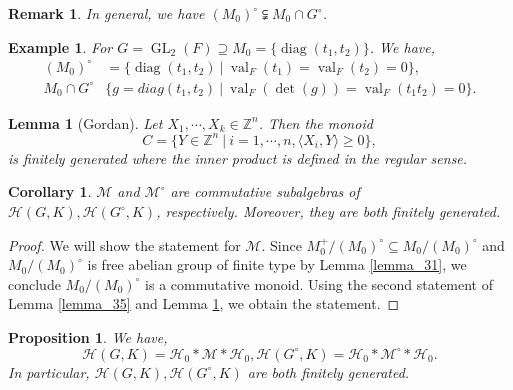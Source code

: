 \documentclass[8pt]{article}
\newtheorem{proposition}{Proposition}[section]
\newtheorem{lemma}{Lemma}[section]
\newtheorem{remark}{Remark}[section]
\newtheorem{corollary}{Corollary} [section]
\newtheorem{example}{Example}[section]
\DeclareMathOperator{\GL}{GL}
\DeclareMathOperator{\val}{val}
\DeclareMathOperator{\diag}{diag}
\newcommand{\Z}[0]{\mathbb{Z}}
\newcommand{\sep}[0]{\:|\:}
\newcommand{\hecke}[0]{\mathscr{H}}
\begin{document}
\begin{remark}
  In general, we have $(M_0)^\circ\subsetneqq M_0\cap G^\circ$.
\end{remark}

\begin{example}
  For $G=\GL_2(F)\supseteq M_0 = \{\diag(t_1,t_2)\}$. We have,
  \begin{align*}
    (M_0)^\circ &= \{\diag(t_1,t_2)\sep \val_F(t_1)=\val_F(t_2) = 0\},\\
    M_0\cap G^\circ & \{g=diag(t_1,t_2)\sep \val_F(\det(g)) = \val_F(t_1t_2) = 0\}.
  \end{align*}
\end{example}

\begin{lemma}[Gordan]
  \label{lemma_gordan}
  Let $X_1,\cdots,X_k\in\Z^n$. Then the monoid 
  \begin{equation*}
    C = \{Y\in\Z^n\sep i=1,\cdots,n, \langle X_i,Y\rangle\geq0\},
  \end{equation*}
  is finitely generated where the inner product is defined in the regular sense.
\end{lemma}

\begin{corollary}
  \label{corollary_36}
  $\mathcal{M}$ and $\mathcal{M}^\circ$ are commutative subalgebras of $\hecke(G,K),\hecke(G^\circ,K)$, respectively. Moreover, they are both finitely generated.
\end{corollary}

\begin{proof}
  We will show the statement for $\mathcal{M}$. Since $M_0^+/(M_0)^\circ\subseteq M_0/(M_0)^\circ$ and $M_0/(M_0)^\circ$ is free abelian group of finite type by Lemma \ref{lemma_31}, we conclude 
  $M_0/(M_0)^\circ$ is a commutative monoid. Using the second statement of Lemma \ref{lemma_35} and Lemma \ref{lemma_gordan}, we obtain the statement.
\end{proof}

\begin{proposition}
  \label{proposition_37}
  We have,
  \begin{equation*}
    \hecke(G,K) = \hecke_0\ast\mathcal{M}\ast\hecke_0,\hecke(G^\circ,K) = \hecke_0\ast\mathcal{M}^\circ\ast\hecke_0.
  \end{equation*}
  In particular, $\hecke(G,K),\hecke(G^\circ,K)$ are both finitely generated.
\end{proposition}
\end{document}

